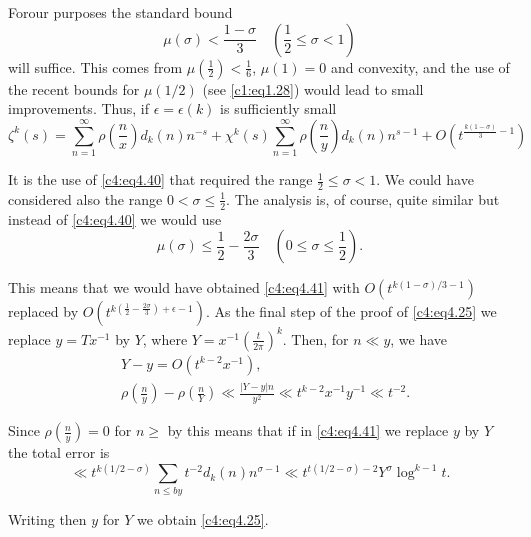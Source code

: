For\pageoriginale our purposes the standard bound
\begin{equation}
  \mu (\sigma) < \frac{1- \sigma}{3} \quad \left(\frac{1}{2} \leq
  \sigma < 1 \right)\label{c4:eq4.40}
\end{equation}
will suffice. This comes from $\mu \left(\frac{1}{2} \right) <
\frac{1}{6}$, $\mu (1) =0$ and convexity, and the use of the recent
bounds for $\mu(1/2)$ (see \eqref{c1:eq1.28}) would lead to small
improvements. Thus, if $\epsilon = \epsilon (k)$ is sufficiently small
{\fontsize{10pt}{12pt}\selectfont
\begin{equation}
  \zeta^k (s) = \sum_{n=1}^\infty \rho \left(\frac{n}{x} \right)d_k
  (n) n^{-s} + \chi^k (s) \sum_{n=1}^\infty \rho \left(\frac{n}{y}\right) d_k
  (n) n^{s-1} + O \left(t^{\frac{k(1- \sigma)}{3}-1}\right)\label{c4:eq4.41}
\end{equation}}

It is the use of \eqref{c4:eq4.40} that required the range
$\frac{1}{2} \leq \sigma < 1$. We could have considered also the range
$0 < \sigma \leq \frac{1}{2}$. The analysis is, of course, quite
similar but instead of \eqref{c4:eq4.40} we would use
$$
\mu (\sigma) \leq \frac{1}{2} - \frac{2 \sigma}{3} \quad (0\leq \sigma
\leq \frac{1}{2}).
$$

This means that we would have obtained \eqref{c4:eq4.41} with
$O(t^{k(1- \sigma)/3-1})$ replaced by $O\left(t^{k \left(\frac{1}{2} -
  \frac{2 \sigma}{3}\right)+ \epsilon-1}\right)$. As the final step of
the proof of \eqref{c4:eq4.25} we replace $y= Tx^{-1}$ by $Y$, where
$Y= x^{-1} \left(\frac{t}{2\pi} \right)^k$. Then, for $n \ll y$, we
have
\begin{align*}
 & Y - y  = O(t^{k-2} x^{-1}),\\
&  \rho \left(\frac{n}{y} \right) - \rho \left(\frac{n}{Y} \right) 
  \ll \frac{|Y-y|n}{y^2} \ll t^{k-2} x^{-1} y^{-1} \ll t^{-2}.
\end{align*}

Since $\rho \left(\frac{n}{y} \right)=0$ for $n \geq$ by this means
that if in \eqref{c4:eq4.41} we replace $y$ by $Y$ the total error is 
$$
\ll t^{k (1/2 - \sigma)} \sum_{n \leq by} t^{-2} d_k (n) n^{\sigma-1}
\ll t^{t(1/2 - \sigma)- 2}Y^\sigma \log^{k-1}t.
$$

Writing then $y$ for $Y$ we obtain \eqref{c4:eq4.25}.

